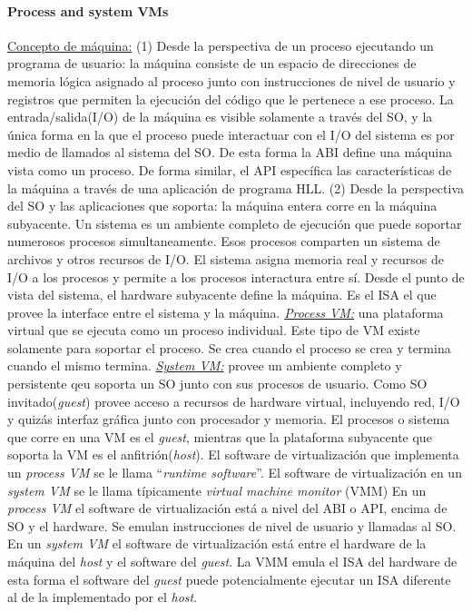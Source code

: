 \paragraph{\textnormal{\textbf{Process and system VMs}}}
\underline{Concepto de máquina:} (1) Desde la perspectiva de un proceso ejecutando un programa de usuario: la máquina consiste de un espacio de direcciones de memoria lógica asignado al proceso junto con instrucciones de nivel de usuario y registros que permiten la ejecución del código que le pertenece a ese proceso. La entrada/salida(I/O) de la máquina es visible solamente a través del SO, y la única forma en la que el proceso puede interactuar con el I/O del sistema es por medio de llamados al sistema del SO. De esta forma la ABI define una máquina vista como un proceso. De forma similar, el API específica las características de la máquina a través de una aplicación de programa HLL. (2) Desde la perspectiva del SO y las aplicaciones que soporta: la máquina entera corre en la máquina subyacente. Un sistema es un ambiente completo de ejecución que puede soportar numerosos procesos simultaneamente. Esos procesos comparten un sistema de archivos y otros recursos de I/O. El sistema asigna memoria real y recursos de I/O a los procesos y permite a los procesos interactura entre sí. Desde el punto de vista del sistema, el hardware subyacente define la máquina. Es el ISA el que provee la interface entre el sistema y la máquina. \underline{\textit{Process VM:}} una plataforma virtual que se ejecuta como un proceso individual. Este tipo de VM existe solamente para soportar el proceso. Se crea cuando el proceso se crea y termina cuando el mismo termina. \underline{\textit{System VM:}} provee un ambiente completo y persistente qeu soporta un SO junto con sus procesos de usuario. Como SO invitado(\emph{guest}) provee acceso a recursos de hardware virtual, incluyendo red, I/O y quizás interfaz gráfica junto con procesador y memoria. El procesos o sistema que corre en una VM es el \emph{guest}, mientras que la plataforma subyacente que soporta la VM es el anfitrión(\emph{host}). El software de virtualización que implementa un \emph{process VM} se le llama ``\emph{runtime software}''. El software de virtualización en un \emph{system VM} se le llama típicamente \emph{virtual machine monitor} (VMM) En un \emph{process VM} el software de virtualización está a nivel del ABI o API, encima de SO y el hardware. Se emulan instrucciones de nivel de usuario y llamadas al SO. En un \emph{system VM} el software de virtualización está entre el hardware de la máquina del \emph{host} y el software del \emph{guest}. La VMM emula el ISA del hardware de esta forma el software del \emph{guest} puede potencialmente ejecutar un ISA diferente al de la implementado por el \emph{host}.

